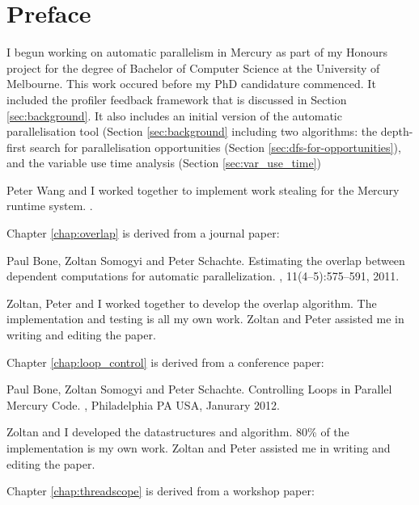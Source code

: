 \documentclass[a4paper,twoside]{report}
\begin{document}
\chapter*{Preface}

I begun working on automatic parallelism in Mercury as part of my Honours project
for the degree of Bachelor of Computer Science at the University of Melbourne.
This work occured before my PhD candidature commenced.
It included the profiler feedback framework that is discussed in Section
\ref{sec:background}.
It also includes an initial version of the automatic parallelisation tool
(Section \ref{sec:background}
including two algorithms:
the depth-first search for parallelisation opportunities
(Section \ref{sec:dfs-for-opportunities}),
and the variable use time analysis (Section \ref{sec:var_use_time})

Peter Wang and I worked together to implement work stealing for the Mercury
runtime system.
.

Chapter \ref{chap:overlap} is derived from a journal paper:

Paul Bone, Zoltan Somogyi and Peter Schachte.
\newblock Estimating the overlap between dependent computations for automatic
  parallelization.
, 11(4--5):575--591,
  2011.

Zoltan, Peter and I worked together to develop the overlap algorithm.
The implementation and testing is all my own work.
Zoltan and Peter assisted me in writing and editing the paper.

Chapter \ref{chap:loop_control} is derived from a conference paper:

Paul Bone, Zoltan Somogyi and Peter Schachte.
\newblock Controlling Loops in Parallel Mercury Code.
,
Philadelphia PA USA, Janurary 2012.

Zoltan and I developed the datastructures and algorithm.
80\% of the implementation is my own work.
Zoltan and Peter assisted me in writing and editing the paper.

Chapter \ref{chap:threadscope} is derived from a workshop paper:
\end{document}
